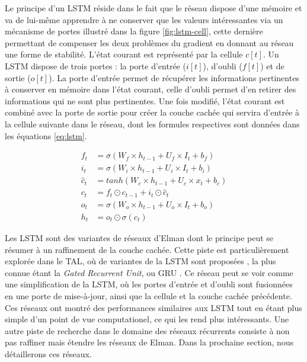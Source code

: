 \documentclass[PhD-Yoann-Dupont.tex]{subfiles}
\begin{document}
Le principe d'un LSTM réside dans le fait que le réseau dispose d'une mémoire et va de lui-même apprendre à ne conserver que les valeurs intéressantes via un mécanisme de portes illustré dans la figure \ref{fig:lstm-cell}, cette dernière permettant de compenser les deux problèmes du gradient en donnant au réseau une forme de stabilité. L'état courant est représenté par la cellule $c[t]$. Un LSTM dispose de trois portes : la porte d'entrée ($i[t]$), d'oubli ($f[t]$) et de sortie ($o[t]$). La porte d'entrée permet de récupérer les informations pertinentes à conserver en mémoire dans l'état courant, celle d'oubli permet d'en retirer des informations qui ne sont plus pertinentes. Une fois modifié, l'état courant est combiné avec la porte de sortie pour créer la couche cachée qui servira d'entrée à la cellule suivante dans le réseau, dont les formules respectives sont données dans les équations \ref{eq:lstm}.

\begin{equation}\label{eq:lstm}
\begin{aligned}
f_{t}     &= \sigma(W_{f} \times h_{t-1} + U_{f} \times I_{t} + b_{f}) \\
i_{t}     &= \sigma(W_{i} \times h_{t-1} + U_{i} \times I_{t} + b_{i}) \\
\hat{c}_t &= tanh(W_{c} \times h_{t-1} + U_{c} \times x_{t} + b_c) \\
c_{t}     &= f_{t} \odot c_{t-1} + i_{t} \odot \hat{c}_{t} \\
o_{t}     &= \sigma(W_{o} \times h_{t-1} + U_{o} \times I_{t} + b_{o}) \\
h_{t}     &= o_{t} \odot \sigma(c_{t})
\end{aligned}
\end{equation}

Les LSTM sont des variantes de réseaux d'Elman dont le principe peut se résumer à un raffinement de la couche cachée. Cette piste est particulièrement explorée dans le TAL, où de variantes de la LSTM sont proposées \citep{chung2014empirical,greff2015lstm,zaremba2015empirical}, la plus connue étant la \emph{Gated Recurrent Unit}, ou GRU \citep{cho2014properties}. Ce réseau peut se voir comme une simplification de la LSTM, où les portes d'entrée et d'oubli sont fusionnées en une porte de mise-à-jour, ainsi que la cellule et la couche cachée précédente. Ces réseaux ont montré des performances similaires aux LSTM tout en étant plus simple d'un point de vue computationel, ce qui les rend plus intéressants. Une autre piste de recherche dans le domaine des réseaux récurrents consiste à non pas raffiner mais étendre les réseaux de Elman. Dans la prochaine section, nous détaillerons ces réseaux.
\end{document}
